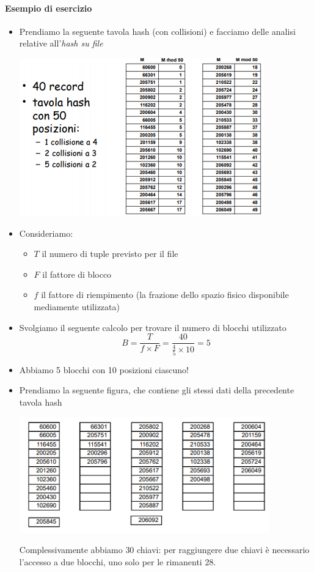 \paragraph{Esempio di esercizio}
\begin{itemize}
	\item Prendiamo la seguente tavola hash (con collisioni) e facciamo delle analisi relative all'\emph{hash su file}
	\begin{center}\includegraphics{images/178.PNG}\end{center}
	\item Consideriamo:
	\begin{itemize}
		\item $T$ il numero di tuple previsto per il file
		\item $F$ il fattore di blocco
		\item $f$ il fattore di riempimento (la frazione dello spazio fisico disponibile mediamente utilizzata)
	\end{itemize}
	\item Svolgiamo il seguente calcolo per trovare il numero di blocchi utilizzato
	\[B=\frac{T}{f \times F}=\frac{40}{\frac{4}{5} \times 10} = 5\]
	\item Abbiamo 5 blocchi con 10 posizioni ciascuno!
	\item Prendiamo la seguente figura, che contiene gli stessi dati della precedente tavola hash
	\begin{center}\includegraphics{images/230.PNG}\end{center}
	Complessivamente abbiamo $30$ chiavi: per raggiungere due chiavi è necessario l'accesso a due blocchi, uno solo per le rimanenti $28$.
\end{itemize}
